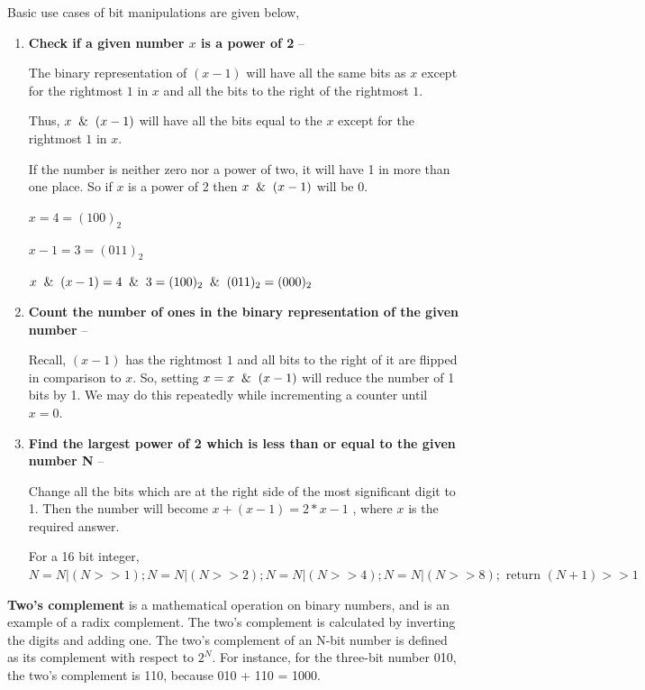 \documentclass{article}
\begin{document}
    Basic use cases of bit manipulations are given below,
    
    \begin{enumerate}
        \item \textbf{Check if a given number $x$ is a power of 2} --
        
        The binary representation of $(x-1)$ will have all the same bits as $x$ except for the rightmost $1$ in $x$ and all the bits to the right of the rightmost $1$. 
        
        Thus, $x \And (x-1)$ will have all the bits equal to the $x$ except for the rightmost $1$ in $x$.
        
        If the number is neither zero nor a power of two, it will have 1 in more than one place. So if $x$ is a power of 2 then $x \And (x-1)$ will be 0.
         
        $x = 4 = (100)_2$
        
        $x - 1 = 3 = (011)_2$
        
        $x \And (x-1) = 4 \And 3 = (100)_2 \And (011)_2 = (000)_2$
         
         \item \textbf{Count the number of ones in the binary representation of the given number} --
         
         Recall, $(x-1)$ has the rightmost $1$ and all bits to the right of it are flipped in comparison to $x$. So, setting $x = x \And (x-1)$ will reduce the number of 1 bits by 1. We may do this repeatedly while incrementing a counter until $x = 0$.
         
         \item \textbf{Find the largest power of 2 which is less than or equal to the given number N} -- 
         
         Change all the bits which are at the right side of the most significant digit to 1. Then the number will become $x + (x-1) = 2 * x -1$ , where $x$ is the required answer.
         
        For a 16 bit integer,
        $N = N| (N>>1);
        N = N| (N>>2);
        N = N| (N>>4);
        N = N| (N>>8); \text{ return } (N+1)>>1$
         
     \end{enumerate}
    
    \textbf{Two's complement} is a mathematical operation on binary numbers, and is an example of a radix complement. The two's complement is calculated by inverting the digits and adding one. The two's complement of an N-bit number is defined as its complement with respect to $2^N$. For instance, for the three-bit number 010, the two's complement is 110, because 010 + 110 = 1000. 
\end{document}
